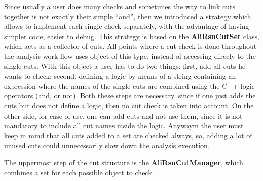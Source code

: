 \documentclass[12pt,a4paper]{article}
\begin{document}
Since usually a user does many checks and sometimes the way to link cuts together is not exactly their simple ``and'', then we introduced a strategy which allows to implement each single check separately, with the advantage of having simpler code, easier to debug.
This strategy is based on the {\bf AliRsnCutSet} class, which acts as a collector of cuts.
All points where a cut check is done throughout the analysis work-flow uses object of this type, instead of accessing direcly to the single cuts.
With this object a user has to do two things: first, add all cuts he wants to check; second, defining a logic by means of a string containing an expression where the names of the single cuts are combined using the C++ logic operators (and, or not). 
Both these steps are necessary, since if one just adds the cuts but does not define a logic, then no cut check is taken into account.
On the other side, for ease of use, one can add cuts and not use them, since it is not mandatory to include all cut names inside the logic. 
Anywaym the user must keep in mind that all cuts added to a set are checked always, so, adding  a lot of unused cuts could unnecessarily slow down the analysis execution.

The uppermost step of the cut structure is the {\bf AliRsnCutManager}, which combines a set for each possible object to check.
\end{document}
